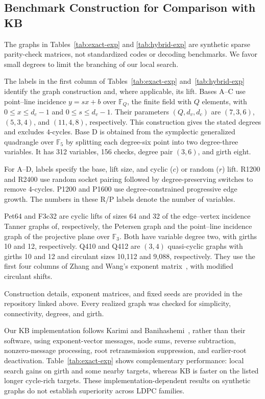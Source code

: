 \documentclass[conference]{IEEEtran}
\begin{document}
\subsection{Benchmark Construction for Comparison with KB
\cite{karimi2013}}
The graphs in Tables~\ref{tab:exact-exp} and
\ref{tab:hybrid-exp} are synthetic sparse parity-check
matrices, not standardized codes or decoding benchmarks.
We favor small degrees to limit the branching of our local search.

The labels in the first column of
Tables~\ref{tab:exact-exp} and~\ref{tab:hybrid-exp}
identify the graph construction and, where applicable, its lift.
Bases A--C use point--line incidence $y=sx+b$ over $\mathbb F_Q$,
the finite field with $Q$ elements, with
$0\le x \le d_c-1$ and $0\le s\le d_v-1$.
Their parameters $(Q,d_v,d_c)$ are $(7,3,6)$, $(5,3,4)$, and
$(11,4,8)$, respectively. This construction gives the stated degrees
and excludes $4$-cycles.
Base D is obtained from the symplectic generalized quadrangle over
$\mathbb F_5$ by splitting each degree-six point into two degree-three
variables. It has 312 variables, 156 checks, degree pair $(3,6)$,
and girth eight.

For A--D, labels specify the base, lift size, and cyclic ($c$) or
random ($r$) lift.
R1200 and R2400 use random socket pairing followed by
degree-preserving switches to remove $4$-cycles.
P1200 and P1600 use degree-constrained progressive edge growth.
The numbers in these R/P labels denote the number of variables.

Pet64 and F3c32 are cyclic lifts of sizes 64 and 32 of the
edge--vertex incidence Tanner graphs of, respectively, the Petersen
graph and the point--line incidence graph of the projective plane
over $\mathbb F_3$. Both have variable degree two, with girths
10 and 12, respectively.
Q410 and Q412 are $(3,4)$ quasi-cyclic graphs with girths 10 and 12
and circulant sizes 10,112 and 9,088, respectively.
They use the first four columns of Zhang and Wang's exponent
matrix~\cite{zhang2010}, with modified circulant shifts.

Construction details, exponent matrices, and fixed seeds are provided
in the repository linked above. Every realized graph was checked for
simplicity, connectivity, degrees, and girth.

Our KB implementation follows Karimi and
Banihashemi~\cite{karimi2013}, rather than their
software, using exponent-vector messages,
node sums, reverse subtraction, nonzero-message
processing, root retransmission suppression,
and earlier-root deactivation.
Table~\ref{tab:exact-exp} shows complementary performance:
local search gains on girth and some nearby targets,
whereas KB is faster on the listed longer cycle-rich targets.
These implementation-dependent results on synthetic graphs
do not establish superiority across LDPC families.
\end{document}
